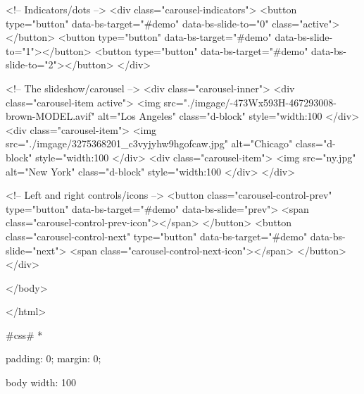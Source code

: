     <!-- Indicators/dots -->
    <div class="carousel-indicators">
      <button type="button" data-bs-target="#demo" data-bs-slide-to="0" class="active"></button>
      <button type="button" data-bs-target="#demo" data-bs-slide-to="1"></button>
      <button type="button" data-bs-target="#demo" data-bs-slide-to="2"></button>
    </div>
    
    <!-- The slideshow/carousel -->
    <div class="carousel-inner">
      <div class="carousel-item active">
        <img src="./imgage/-473Wx593H-467293008-brown-MODEL.avif" alt="Los Angeles" class="d-block" style="width:100%
      </div>
      <div class="carousel-item">
        <img src="./imgage/3275368201_c3vyjyhw9hgofcaw.jpg" alt="Chicago" class="d-block" style="width:100%
      </div>
      <div class="carousel-item">
        <img src="ny.jpg" alt="New York" class="d-block" style="width:100%
      </div>
    </div>
    
    <!-- Left and right controls/icons -->
    <button class="carousel-control-prev" type="button" data-bs-target="#demo" data-bs-slide="prev">
      <span class="carousel-control-prev-icon"></span>
    </button>
    <button class="carousel-control-next" type="button" data-bs-target="#demo" data-bs-slide="next">
      <span class="carousel-control-next-icon"></span>
    </button>
  </div>
  
  
     
    </body>

</html>
                                           


                                           #css#
                                           * {
                                            padding: 0;
                                            margin: 0;
                                            
                                        }
                                        
                                        body {
                                            width: 100%
                                        }
                                        
